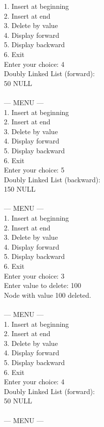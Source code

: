 \documentclass[12pt,a4paper]{article}
\begin{document}
\begin{tcolorbox}[terminalstyle, title=Sample Output]
{1. Insert at beginning\\
2. Insert at end\\
3. Delete by value\\
4. Display forward\\
5. Display backward\\
6. Exit\\
Enter your choice: 4\\
Doubly Linked List (forward):\\
50   \quad NULL\\
\\
--- MENU ---\\
1. Insert at beginning\\
2. Insert at end\\
3. Delete by value\\
4. Display forward\\
5. Display backward\\
6. Exit\\
Enter your choice: 5\\
Doubly Linked List (backward):\\
150   \quad NULL\\
\\
--- MENU ---\\
1. Insert at beginning\\
2. Insert at end\\
3. Delete by value\\
4. Display forward\\
5. Display backward\\
6. Exit\\
Enter your choice: 3\\
Enter value to delete: 100\\
Node with value 100 deleted.\\
\\
--- MENU ---\\
1. Insert at beginning\\
2. Insert at end\\
3. Delete by value\\
4. Display forward\\
5. Display backward\\
6. Exit\\
Enter your choice: 4\\
Doubly Linked List (forward):\\
50  \quad NULL\\
\\
--- MENU ---\\
}
\end{tcolorbox}
\end{document}
